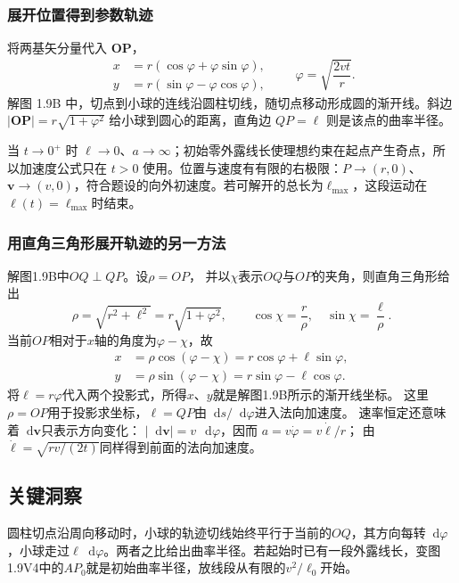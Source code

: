 \documentclass[UTF8,fontset=fandol,a4paper,11pt]{ctexart}
\newcommand{\dd}{\mathop{}\!\mathrm{d}}
\newcommand{\vect}[1]{\bm{#1}}
\begin{document}
\subsubsection*{展开位置得到参数轨迹}
将两基矢分量代入 $\vect{OP}$，
\[
\boxed{\begin{aligned}
x&=r(\cos\varphi+\varphi\sin\varphi),\\
y&=r(\sin\varphi-\varphi\cos\varphi),
\end{aligned}\qquad\varphi=\sqrt{\frac{2vt}{r}}}.
\]
解图 1.9B 中，切点到小球的连线沿圆柱切线，随切点移动形成圆的渐开线。斜边 $|\vect{OP}|=r\sqrt{1+\varphi^2}$ 给小球到圆心的距离，直角边 $QP=\ell$ 则是该点的曲率半径。

当 $t\to0^+$ 时 $\ell\to0$、$a\to\infty$；初始零外露线长使理想约束在起点产生奇点，所以加速度公式只在 $t>0$ 使用。位置与速度有有限的右极限：$P\to(r,0)$、$\vect v\to(v,0)$，符合题设的向外初速度。若可解开的总长为$\ell_{\max}$，这段运动在$\ell(t)=\ell_{\max}$时结束。
\subsubsection*{用直角三角形展开轨迹的另一方法}
解图1.9B中$OQ\perp QP$。设$\rho=OP$，
并以$\chi$表示$OQ$与$OP$的夹角，则直角三角形给出
\[
\rho=\sqrt{r^2+\ell^2}=r\sqrt{1+\varphi^2},\qquad
\cos\chi=\frac r\rho,\quad \sin\chi=\frac{\ell}{\rho}.
\]
当前$OP$相对于$x$轴的角度为$\varphi-\chi$，故
\[
\begin{aligned}
x&=\rho\cos(\varphi-\chi)
=r\cos\varphi+\ell\sin\varphi,\\
y&=\rho\sin(\varphi-\chi)
=r\sin\varphi-\ell\cos\varphi.
\end{aligned}
\]
将$\ell=r\varphi$代入两个投影式，所得$x$、$y$就是解图1.9B所示的渐开线坐标。
这里$\rho=OP$用于投影求坐标，$\ell=QP$由$\dd s/\dd\varphi$进入法向加速度。
速率恒定还意味着$\dd\vect v$只表示方向变化：
$|\dd\vect v|=v\,\dd\varphi$，因而
$a=v\dot\varphi=v\dot\ell/r$；
由$\dot\ell=\sqrt{rv/(2t)}$同样得到前面的法向加速度。




\subsection*{关键洞察}

圆柱切点沿周向移动时，小球的轨迹切线始终平行于当前的$OQ$，其方向每转$\dd\varphi$，小球走过$\ell\dd\varphi$。两者之比给出曲率半径。若起始时已有一段外露线长，变图1.9V4中的$AP_0$就是初始曲率半径，放线段从有限的$v^2/\ell_0$开始。
\end{document}
